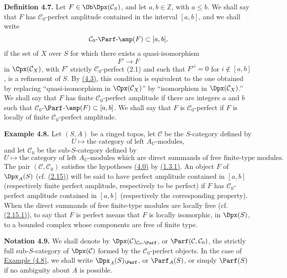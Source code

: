 \textbf{Definition 4.7.} Let \(F\in\Ob\Dpx(\mathcal C_S)\), and let \(a,b\in\mathbb Z\), with \(a\leq b\). We shall say that \(F\) has \(\mathcal C_0\)-perfect amplitude contained in the interval \([a,b]\), and we shall write
\[
  \mathcal C_0\text{-}\Parf\text{-}\amp(F)\subset[a,b],
\]
if the set of \(X\) over \(S\) for which there exists a quasi-isomorphism
\[
  F'\longrightarrow F
\]
in \(\Cpx(\mathcal C_X)\), with \(F'\) strictly \(\mathcal C_0\)-perfect (2.1) and such that \(F'^i=0\) for \(i\notin[a,b]\), is a refinement of \(S\). By \hyperlink{sga6.e01.cor.4-3}{(4.3)}, this condition is equivalent to the one obtained by replacing ``quasi-isomorphism in \(\Cpx(\mathcal C_X)\)'' by ``isomorphism in \(\Dpx(\mathcal C_X)\).'' We shall say that \(F\) has finite \(\mathcal C_0\)-perfect amplitude if there are integers \(a\) and \(b\) such that \(\mathcal C_0\)-\(\Parf\)-\(\amp(F)\subset[a,b]\). We shall say that \(F\) is \(\mathcal C_0\)-perfect if \(F\) is locally of finite \(\mathcal C_0\)-perfect amplitude.

\textbf{Example 4.8.} Let \((S,A)\) be a ringed topos, let \(\mathcal C\) be the \(S\)-category defined by
\[
  U\longmapsto \text{the category of left }A_U\text{-modules},
\]
and let \(\mathcal C_0\) be the sub-\(S\)-category defined by
\[
  U\longmapsto \text{the category of left }A_U\text{-modules which are direct summands of free finite-type modules}.
\]
The pair \((\mathcal C,\mathcal C_0)\) satisfies the hypotheses \hyperlink{sga6.e01.para.4-0}{(4.0)} by \hyperlink{sga6.e01.lem.1-3-1}{(1.3.1)}. An object \(F\) of \(\Dpx_A(S)\) (cf. \hyperlink{sga6.e01.ex.2-15}{(2.15)}) will be said to have perfect amplitude contained in \([a,b]\) (respectively finite perfect amplitude, respectively to be perfect) if \(F\) has \(\mathcal C_0\)-perfect amplitude contained in \([a,b]\) (respectively the corresponding property). When the direct summands of free finite-type modules are locally free (cf. \hyperlink{sga6.e01.lem.2-15-1}{(2.15.1)}), to say that \(F\) is perfect means that \(F\) is locally isomorphic, in \(\Dpx(S)\), to a bounded complex whose components are free of finite type.

\textbf{Notation 4.9.} We shall denote by \(\Dpx(\mathcal C)_{\mathcal C_0\text{-}\Parf}\), or \(\Parf(\mathcal C,\mathcal C_0)\), the strictly full sub-\(S\)-category of \(\Dpx(\mathcal C)\) formed by the \(\mathcal C_0\)-perfect objects. In the case of \hyperlink{sga6.e01.ex.4-8}{Example (4.8)}, we shall write \(\Dpx_A(S)_{\Parf}\), or \(\Parf_A(S)\), or simply \(\Parf(S)\) if no ambiguity about \(A\) is possible.

